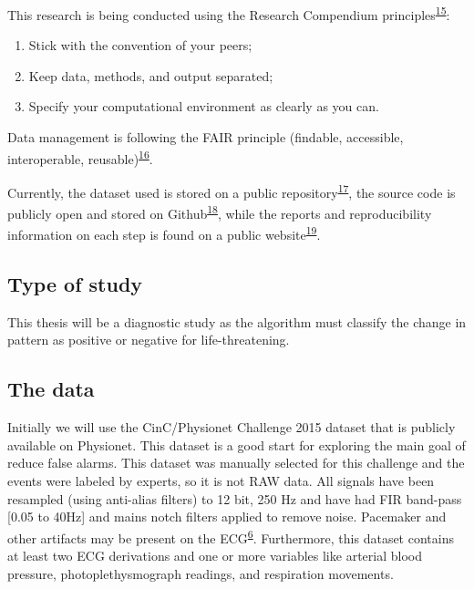 \documentclass[12pt,twoside]{fmupthesis}
\providecommand{\tightlist}{%
  \setlength{\itemsep}{0pt}\setlength{\parskip}{0pt}}
\begin{document}
This research is being conducted using the Research Compendium principles\textsuperscript{\protect\hyperlink{ref-compendium2019}{15}}:
\begin{enumerate}
\def\labelenumi{\arabic{enumi}.}
\tightlist
\item
  Stick with the convention of your peers;
\item
  Keep data, methods, and output separated;
\item
  Specify your computational environment as clearly as you can.
\end{enumerate}
Data management is following the FAIR principle (findable, accessible, interoperable, reusable)\textsuperscript{\protect\hyperlink{ref-wilkinson2016}{16}}.

Currently, the dataset used is stored on a public repository\textsuperscript{\protect\hyperlink{ref-franz_dataset}{17}}, the source code is publicly open and
stored on Github\textsuperscript{\protect\hyperlink{ref-franz_github}{18}}, while the reports and reproducibility information on each step is found on a public
website\textsuperscript{\protect\hyperlink{ref-franz_website}{19}}.

\hypertarget{type-of-study}{%
\subsection{Type of study}\label{type-of-study}}

This thesis will be a diagnostic study as the algorithm must classify the change in pattern as positive or negative for
life-threatening.

\hypertarget{the-data}{%
\subsection{The data}\label{the-data}}

Initially we will use the CinC/Physionet Challenge 2015 dataset that is publicly available on Physionet. This dataset is
a good start for exploring the main goal of reduce false alarms. This dataset was manually selected for this challenge
and the events were labeled by experts, so it is not RAW data. All signals have been resampled (using anti-alias
filters) to 12 bit, 250 Hz and have had FIR band-pass {[}0.05 to 40Hz{]} and mains notch filters applied to remove noise.
Pacemaker and other artifacts may be present on the ECG\textsuperscript{\protect\hyperlink{ref-Clifford2015}{6}}. Furthermore, this dataset contains at least two
ECG derivations and one or more variables like arterial blood pressure, photoplethysmograph readings, and respiration
movements.
\end{document}
